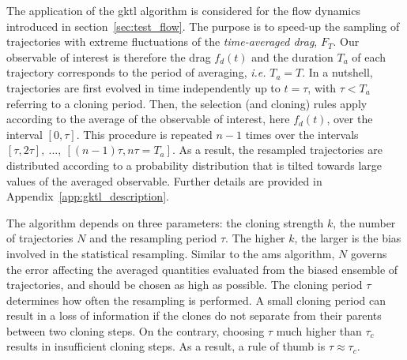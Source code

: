 The application of the \ac{gktl} algorithm is considered for the flow dynamics introduced in section~\ref{sec:test_flow}. The purpose is to speed-up the sampling of trajectories with extreme fluctuations of the \textit{time-averaged drag}, $F_T$. 
Our observable of interest is therefore the drag $f_d(t)$ and the duration $T_a$ of each trajectory corresponds to the period of averaging, \emph{i.e.} $T_a=T$.    
%
In a nutshell, trajectories are first evolved in time  independently up to $t=\tau $, with $\tau < T_a$ referring to a cloning period. Then, the selection (and cloning) rules apply according to the average of the observable of interest, here $f_d(t)$, over the interval $[0,\tau]$. 
This procedure is repeated $n-1$ times over the intervals $[\tau, 2\tau],~...,~[(n-1)\tau, n\tau = T_a]$. As a result, the resampled trajectories are distributed according to a probability distribution that is tilted towards large values of the averaged observable. Further details are provided in Appendix~\ref{app:gktl_description}.

%
The algorithm depends on three parameters: the cloning strength $k$, the number of trajectories $N$ and the resampling period $\tau$. The higher $k$, the larger is the bias involved in the statistical resampling. 
Similar to the \ac{ams} algorithm, $N$ governs the error affecting the averaged quantities evaluated from the biased ensemble of trajectories, and should be chosen as high as possible. The cloning period $\tau$ determines how often the resampling is performed. 
A small cloning period can result in a loss of information if the clones do not separate from their parents between two cloning steps. On the contrary, choosing $\tau$ much higher than  $\tau_c$  results in insufficient cloning steps.
As a result, a rule of thumb is $\tau \approx \tau_c$.

